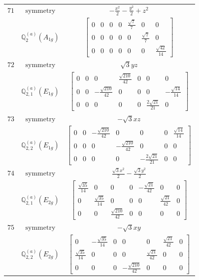 \documentclass[fleqn,8pt,landscape]{jsarticle}
\begin{document}
\begin{longtable}{ccc}
$ 71 $ & $ \text{symmetry} $ & $ - \frac{x^{2}}{2} - \frac{y^{2}}{2} + z^{2} $ \\
$  $ & $ \mathbb{Q}_{2}^{(a)}(A_{1g}) $ & $ \begin{bmatrix} 0 & 0 & 0 & 0 & \frac{\sqrt{7}}{7} & 0 & 0 \\ 0 & 0 & 0 & 0 & 0 & \frac{\sqrt{7}}{7} & 0 \\ 0 & 0 & 0 & 0 & 0 & 0 & \frac{\sqrt{42}}{14} \end{bmatrix} $ \\ \hline
$ 72 $ & $ \text{symmetry} $ & $ \sqrt{3} y z $ \\
$  $ & $ \mathbb{Q}_{2,1}^{(a)}(E_{1g}) $ & $ \begin{bmatrix} 0 & 0 & 0 & \frac{\sqrt{210}}{42} & 0 & 0 & 0 \\ 0 & 0 & - \frac{\sqrt{210}}{42} & 0 & 0 & 0 & - \frac{\sqrt{14}}{14} \\ 0 & 0 & 0 & 0 & 0 & \frac{2 \sqrt{21}}{21} & 0 \end{bmatrix} $ \\ \hline
$ 73 $ & $ \text{symmetry} $ & $ - \sqrt{3} x z $ \\
$  $ & $ \mathbb{Q}_{2,2}^{(a)}(E_{1g}) $ & $ \begin{bmatrix} 0 & 0 & - \frac{\sqrt{210}}{42} & 0 & 0 & 0 & \frac{\sqrt{14}}{14} \\ 0 & 0 & 0 & - \frac{\sqrt{210}}{42} & 0 & 0 & 0 \\ 0 & 0 & 0 & 0 & - \frac{2 \sqrt{21}}{21} & 0 & 0 \end{bmatrix} $ \\ \hline
$ 74 $ & $ \text{symmetry} $ & $ \frac{\sqrt{3} x^{2}}{2} - \frac{\sqrt{3} y^{2}}{2} $ \\
$  $ & $ \mathbb{Q}_{2,1}^{(a)}(E_{2g}) $ & $ \begin{bmatrix} \frac{\sqrt{35}}{14} & 0 & 0 & 0 & - \frac{\sqrt{21}}{42} & 0 & 0 \\ 0 & \frac{\sqrt{35}}{14} & 0 & 0 & 0 & \frac{\sqrt{21}}{42} & 0 \\ 0 & 0 & \frac{\sqrt{210}}{42} & 0 & 0 & 0 & 0 \end{bmatrix} $ \\ \hline
$ 75 $ & $ \text{symmetry} $ & $ - \sqrt{3} x y $ \\
$  $ & $ \mathbb{Q}_{2,2}^{(a)}(E_{2g}) $ & $ \begin{bmatrix} 0 & - \frac{\sqrt{35}}{14} & 0 & 0 & 0 & \frac{\sqrt{21}}{42} & 0 \\ \frac{\sqrt{35}}{14} & 0 & 0 & 0 & \frac{\sqrt{21}}{42} & 0 & 0 \\ 0 & 0 & 0 & - \frac{\sqrt{210}}{42} & 0 & 0 & 0 \end{bmatrix} $ \\ \hline

\end{longtable}
\end{document}
